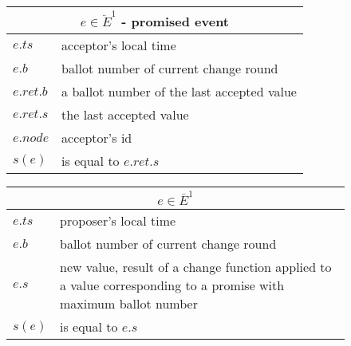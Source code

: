 \documentclass[a4paper,USenglish]{lipics-v2018}
\theoremstyle{definition}
\begin{document}
\begin{figure}[!h]
    \centering
    \begin{minipage}{0.47\textwidth}
        \centering
        \begin{tabular}{|p{1cm}|p{4cm}|}
            \hline
            \multicolumn{2}{|c|}{$e \in \ddot{E}^1$ - promised event}\\
            \hline
            $e.ts$ & acceptor's local time\\
            \hline
            $e.b$ & ballot number of current change round\\
            \hline
            $e.ret.b$ & a ballot number of the last accepted value\\
            \hline
            $e.ret.s$ & the last accepted value\\
            \hline
            $e.node$ & acceptor's id\\
            \hline
            \hline
            $s(e)$ & is equal to $e.ret.s$\\
            \hline
        \end{tabular}
    \end{minipage}
    \hspace{\fill} %
    \begin{minipage}{0.47\textwidth}
        \centering
        \begin{tabular}{|p{1cm}|p{4cm}|}
            \hline
            \multicolumn{2}{|c|}{$e \in \bar{E}^1$}\\
            \hline
            $e.ts$ & proposer's local time\\
            \hline
            $e.b$ & ballot number of current change round\\
            \hline
            $e.s$ & new value, result of a change function applied to a value corresponding to a promise with maximum ballot number\\
            \hline
            \hline
            $s(e)$ & is equal to $e.s$\\
            \hline
        \end{tabular}
    \end{minipage}
    
    \vspace*{1cm}


\end{figure}
\end{document}
